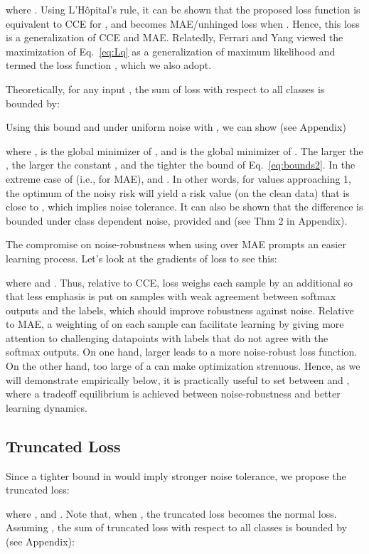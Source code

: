 \documentclass{article}
\begin{document}
where . Using L'Hôpital's rule, it can be shown that the proposed loss function is equivalent to CCE for , and becomes MAE/unhinged loss when . 
Hence, this loss is a generalization of CCE and MAE. 
Relatedly, Ferrari and Yang \cite{ferrari2010maximum} viewed the maximization of Eq.~\ref{eq:Lq} as a generalization of maximum likelihood and termed the loss function , which we also adopt.


Theoretically, for any input , the sum of  loss with respect to all classes is bounded by:

Using this bound and under uniform noise with , we can show (see Appendix) 

where ,  is the global minimizer of , and  is the global minimizer of . The larger the , the larger the constant , and the tighter the bound of Eq.~\ref{eq:bounds2}. 
In the extreme case of  (i.e., for MAE),  and . 
In other words, for  values approaching 1, the optimum of the noisy risk will yield a risk value (on the clean data) that is close to , which implies noise tolerance. 
It can also be shown that the difference  is bounded under class dependent noise, provided  and   (see Thm 2 in Appendix).

The compromise on noise-robustness when using  over MAE prompts an easier learning process. 
Let's look at the gradients of  loss to see this:

where    and . 
Thus, relative to CCE,  loss weighs each sample by an additional  so that less emphasis is put on samples with weak agreement between softmax outputs and the labels, which should improve robustness against noise. 
Relative to MAE, a weighting of  on each sample can facilitate learning by giving more attention to challenging datapoints with labels that do not agree with the softmax outputs. 
On one hand, larger  leads to a more noise-robust loss function. 
On the other hand, too large of a  can make optimization strenuous. 
Hence, as we will demonstrate empirically below, it is practically useful to set  between  and , where a tradeoff equilibrium is achieved between noise-robustness and better learning dynamics. 

\subsection{Truncated  Loss}
\label{trunc_loss}
Since a tighter bound in  would imply stronger noise tolerance, we propose the truncated  loss:

where , and . Note that, when , the truncated  loss becomes the normal  loss.  Assuming , the sum of truncated  loss with respect to all classes is bounded by (see Appendix):
\end{document}
